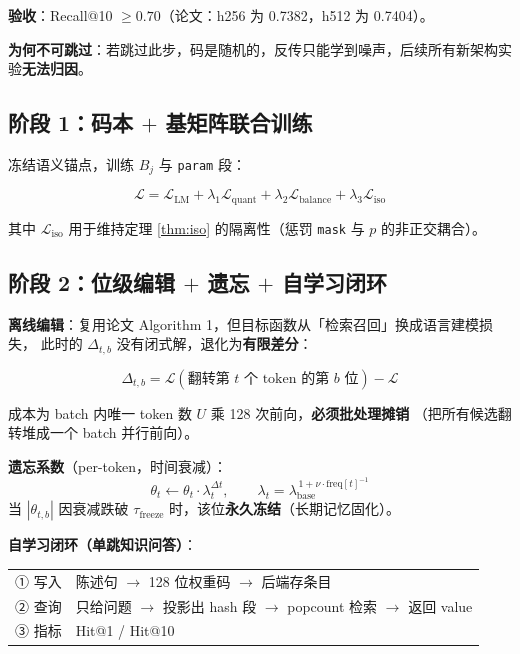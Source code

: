 \documentclass[11pt,a4paper]{ctexart}
\newcommand{\warn}[1]{\textcolor{warnred}{\textbf{#1}}}
\theoremstyle{definition}
\begin{document}
\textbf{验收}：Recall@10 $\ge 0.70$（论文：h256 为 0.7382，h512 为 0.7404）。

\textbf{为何不可跳过}：若跳过此步，码是随机的，反传只能学到噪声，后续所有新架构实验\textbf{无法归因}。

\subsection{阶段 1：码本 $+$ 基矩阵联合训练}

冻结语义锚点，训练 $B_j$ 与 \texttt{param} 段：

\begin{equation}
\mathcal{L}=\mathcal{L}_{\text{LM}}+\lambda_1\mathcal{L}_{\text{quant}}+\lambda_2\mathcal{L}_{\text{balance}}+\lambda_3\mathcal{L}_{\text{iso}}
\end{equation}

其中 $\mathcal{L}_{\text{iso}}$ 用于维持定理 \ref{thm:iso} 的隔离性（惩罚 \texttt{mask} 与 $p$ 的非正交耦合）。

\subsection{阶段 2：位级编辑 $+$ 遗忘 $+$ 自学习闭环}

\textbf{离线编辑}：复用论文 Algorithm 1，但目标函数从「检索召回」换成语言建模损失，
此时的 $\Delta_{t,b}$ 没有闭式解，退化为\textbf{有限差分}：

\begin{equation}
\Delta_{t,b}=\mathcal{L}(\text{翻转第 }t\text{ 个 token 的第 }b\text{ 位})-\mathcal{L}
\end{equation}

成本为 batch 内唯一 token 数 $U$ 乘 128 次前向，\warn{必须批处理摊销}
（把所有候选翻转堆成一个 batch 并行前向）。

\textbf{遗忘系数}（per-token，时间衰减）：
\begin{equation}
\theta_{t}\leftarrow\theta_{t}\cdot\lambda_t^{\Delta t},\qquad
\lambda_t=\lambda_{\text{base}}^{\,1+\nu\cdot \text{freq}[t]^{-1}}
\end{equation}
当 $|\theta_{t,b}|$ 因衰减跌破 $\tau_{\text{freeze}}$ 时，该位\textbf{永久冻结}（长期记忆固化）。

\textbf{自学习闭环（单跳知识问答）}：
\begin{center}
\begin{tabularx}{\textwidth}{@{}lX@{}}
\toprule
① 写入 & 陈述句 $\to$ 128 位权重码 $\to$ 后端存条目 \\
② 查询 & 只给问题 $\to$ 投影出 hash 段 $\to$ popcount 检索 $\to$ 返回 value \\
③ 指标 & Hit@1 / Hit@10 \\
\bottomrule
\end{tabularx}
\end{center}
\end{document}
